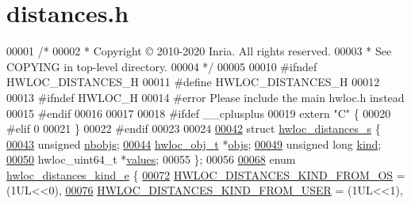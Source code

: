 \hypertarget{a00131_source}{}\section{distances.\+h}
\label{a00131_source}

\begin{DoxyCode}
00001 \textcolor{comment}{/*}
00002 \textcolor{comment}{ * Copyright © 2010-2020 Inria.  All rights reserved.}
00003 \textcolor{comment}{ * See COPYING in top-level directory.}
00004 \textcolor{comment}{ */}
00005 
00010 \textcolor{preprocessor}{#ifndef HWLOC\_DISTANCES\_H}
00011 \textcolor{preprocessor}{#define HWLOC\_DISTANCES\_H}
00012 
00013 \textcolor{preprocessor}{#ifndef HWLOC\_H}
00014 \textcolor{preprocessor}{#error Please include the main hwloc.h instead}
00015 \textcolor{preprocessor}{#endif}
00016 
00017 
00018 \textcolor{preprocessor}{#ifdef \_\_cplusplus}
00019 \textcolor{keyword}{extern} \textcolor{stringliteral}{"C"} \{
00020 \textcolor{preprocessor}{#elif 0}
00021 \}
00022 \textcolor{preprocessor}{#endif}
00023 
00024 
\hyperlink{a00310}{00042} \textcolor{keyword}{struct }\hyperlink{a00310}{hwloc\_distances\_s} \{
\hyperlink{a00310_a4ca2af858cebbce7324ec49903d09474}{00043}   \textcolor{keywordtype}{unsigned} \hyperlink{a00310_a4ca2af858cebbce7324ec49903d09474}{nbobjs};                
\hyperlink{a00310_af1e78b2d628d191fa6cae3fbfe891078}{00044}   \hyperlink{a00238}{hwloc\_obj\_t} *\hyperlink{a00310_af1e78b2d628d191fa6cae3fbfe891078}{objs};             
\hyperlink{a00310_aef9c83cf467da1b1fa4c36493febb3b5}{00049}   \textcolor{keywordtype}{unsigned} \textcolor{keywordtype}{long} \hyperlink{a00310_aef9c83cf467da1b1fa4c36493febb3b5}{kind};               
\hyperlink{a00310_ae43e19b2c743de05c93d71a30beaca75}{00050}   hwloc\_uint64\_t *\hyperlink{a00310_ae43e19b2c743de05c93d71a30beaca75}{values}; 
00055 \};
00056 
\hyperlink{a00208_gab1bb10d3adb85b52cdc6fe5a7f74f108}{00068} \textcolor{keyword}{enum} \hyperlink{a00208_gab1bb10d3adb85b52cdc6fe5a7f74f108}{hwloc\_distances\_kind\_e} \{
\hyperlink{a00208_ggab1bb10d3adb85b52cdc6fe5a7f74f108a90dc38248c8d5392d4dd3e88f391e984}{00072}   \hyperlink{a00208_ggab1bb10d3adb85b52cdc6fe5a7f74f108a90dc38248c8d5392d4dd3e88f391e984}{HWLOC\_DISTANCES\_KIND\_FROM\_OS} = (1UL<<0),
\hyperlink{a00208_ggab1bb10d3adb85b52cdc6fe5a7f74f108a0148d7f9be833a04f5a55455437c227b}{00076}   \hyperlink{a00208_ggab1bb10d3adb85b52cdc6fe5a7f74f108a0148d7f9be833a04f5a55455437c227b}{HWLOC\_DISTANCES\_KIND\_FROM\_USER} = (1UL<<1),

\end{DoxyCode}
